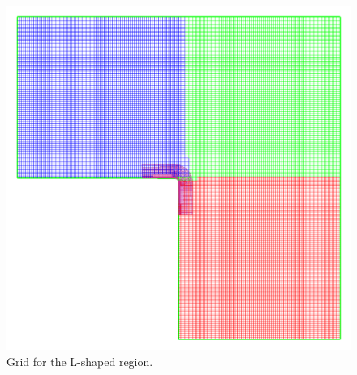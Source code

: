 \renewcommand{\figWidth}{.5\linewidth}
\begin{figure}
\begin{center}
\includegraphics[width=\figWidth]{figures/lgrid2e-order4-grid}
\end{center}
\caption{Grid for the L-shaped region.}
\end{figure}
\renewcommand{\figWidth}{.495\linewidth}
